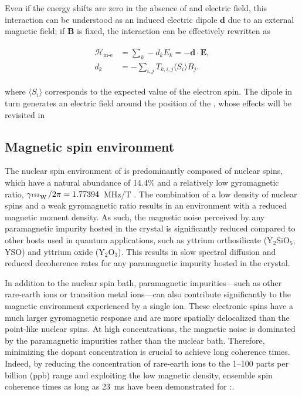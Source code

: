 Even if the energy shifts are zero in the absence of and electric field, this interaction can be understood as an induced electric dipole $\mathbf{d}$ due to an external magnetic field; if $\mathbf{B}$ is fixed, the interaction can be effectively rewritten as 

\begin{align}
\begin{split}
    \mathcal{H}_{\text{m-e}} &= \sum_k-d_k E_k = -\mathbf{d} \cdot \mathbf{E}, \\
    d_k &= - \sum_{i,j} T_{k, i, j} \langle S_{i}\rangle B_j.
\end{split}
\label{seq:electric_dipole}
\end{align}

where $\langle S_i \rangle$ corresponds to the expected value of the electron spin. The dipole in turn generates an electric field around the position of the \Er, whose effects will be revisited in 

\subsection{Magnetic spin environment}

The nuclear spin environment of \Ca is predominantly composed of \W nuclear spins, which have a natural abundance of 14.4\% and a relatively low gyromagnetic ratio, $\gamma_{\text{$^{183}$W\,}}/2\pi = 1.77394$~MHz/T . The combination of a low density of nuclear spins and a weak gyromagnetic ratio results in an environment with a reduced magnetic moment density.
As such, the magnetic noise perceived by any paramagnetic impurity hosted in the crystal is significantly reduced compared to other hosts used in quantum applications, such as yttrium orthosilicate (Y$_2$SiO$_5$, YSO) and yttrium oxide (Y$_2$O$_3$). This results in slow spectral diffusion and reduced decoherence rates for any paramagnetic impurity hosted in the crystal.

In addition to the nuclear spin bath, paramagnetic impurities—such as other rare-earth ions or transition metal ions—can also contribute significantly to the magnetic environment experienced by a single \Er ion. These electronic spins have a much larger gyromagnetic response and are more spatially delocalized than the point-like nuclear spins. At high concentrations, the magnetic noise is dominated by the paramagnetic impurities rather than the nuclear bath. Therefore, minimizing the dopant concentration is crucial to achieve long coherence times. Indeed, by reducing the concentration of rare-earth ions to the 1--100 parts per billion (ppb) range and exploiting the low magnetic density, ensemble spin coherence times as long as 23~ms have been demonstrated for \Er:\Ca {}.

